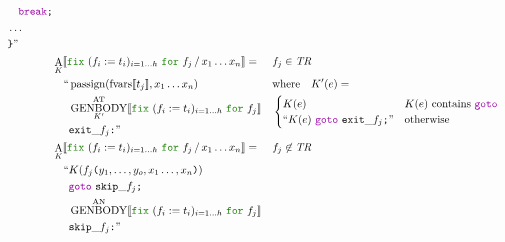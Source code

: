 \documentclass[a4paper,fleqn]{article}
\newcommand{\kwfix}{\mbox{\color{mygreen}\ttfamily fix}}
\newcommand{\kwfor}{\mbox{\color{mygreen}\ttfamily for}}
\newcommand{\fix}[4]{\kwfix~(#1 := #2)_{#3}~\kwfor~#4}
\newcommand{\BRA}[1]{\llbracket #1 \rrbracket}
\DeclareMathOperator{\genbody}{GENBODY}
\newcommand{\genbodyat}[2]{\genbody^\mathrm{AT}_{#1}\BRA{#2}}
\newcommand{\genbodyan}[1]{\genbody^\mathrm{AN}\BRA{#1}}
\newcommand{\tr}{\mathit{TR}}
\newcommand{\dq}[1]{\text{``}#1\text{''}}
\newcommand{\ttparen}[1]{\texttt{(}#1\texttt{)}}
\newcommand{\ttrbrace}{\texttt{\}}}
\newcommand{\ttsemi}{\texttt{;}}
\newcommand{\ttcolon}{\texttt{:}}
\newcommand{\kwbreak}{\mbox{\color{myviolet}\ttfamily break}}
\newcommand{\kwgoto}{\mbox{\color{myviolet}\ttfamily goto}}
\DeclareMathOperator{\passign}{passign}
\DeclareMathOperator{\fvarsop}{fvars}
\newcommand{\fvars}[1]{\fvarsop\BRA{#1}}
\DeclareMathOperator{\Aop}{A}
\newcommand{\A}[3]{\Aop_{#1}\BRA{#2\,/\,#3}}
\begin{document}
\begin{align*}
\begin{alignedat}{2}
                 & \quad \kwbreak\ttsemi \\
                 & \dots \\
                 & \ttrbrace\text{''}
       \end{alignedat} \\
  &\A{K}{\fix{f_i}{t_i}{i=1\dots h}{f_j}}{x_1\dots x_n} =                   && f_j \in \tr \\
     & \quad\begin{alignedat}[t]{2}
       \text{``} & \passign(\fvars{t_j}, x_1\dots x_n) \\
                 & \genbodyat{K'}{\fix{f_i}{t_i}{i=1\dots h}{f_j}} \\
                 & \mathtt{exit\_}f_j\ttcolon \text{''}
       \end{alignedat} &&
               \begin{alignedat}[t]{1}
                  & \text{where}\quad K'(e) = \\
                  & \begin{cases}
                    K(e) & \text{$K(e)$ contains \kwgoto}  \\
                    \dq{K(e)~\kwgoto~\mathtt{exit\_}f_j\ttsemi} & \text{otherwise}
                  \end{cases}
                \end{alignedat} \\
  &\A{K}{\fix{f_i}{t_i}{i=1\dots h}{f_j}}{x_1\dots x_n} =                      && f_j \not\in \tr \\
     & \quad\begin{alignedat}[t]{2}
       \text{``} & K(f_j\ttparen{y_1,\dots,y_o,x_1\dots, x_n})                  \\
                 & \kwgoto~\mathtt{skip\_}f_j\ttsemi                                    \\
                 & \genbodyan{\fix{f_i}{t_i}{i=1\dots h}{f_j}}                          \\
                 & \mathtt{skip\_}f_j\ttcolon \text{''}
       \end{alignedat}
\end{align*}
\end{document}
